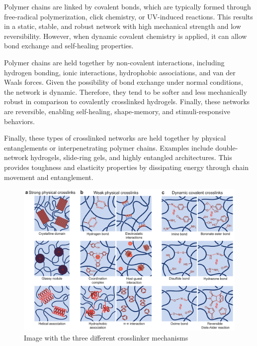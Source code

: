 Polymer chains are linked by covalent bonds, which are typically formed through free-radical polymerization, click chemistry, or UV-induced reactions.
This results in a static, stable, and robust network with high mechanical strength and low reversibility.
However, when dynamic covalent chemistry is applied, it can allow bond exchange and self-healing properties.

Polymer chains are held together by non-covalent interactions, including hydrogen bonding, ionic interactions, hydrophobic associations, and van der Waals forces.
Given the possibility of bond exchange under normal conditions, the network is dynamic.
Therefore, they tend to be softer and less mechanically robust in comparison to covalently crosslinked hydrogels.
Finally, these networks are reversible, enabling self-healing, shape-memory, and stimuli-responsive behaviors.

Finally, these types of crosslinked networks are held together by physical entanglements or interpenetrating polymer chains.
Examples include double-network hydrogels, slide-ring gels, and highly entangled architectures.
This provides toughness and elasticity properties by dissipating energy through chain movement and entanglement.

\begin{figure}[!ht]
    \centering
    \includegraphics[width=\textwidth]{figs/crosslinker_mechanisms.png}
    \caption{Image with the three different crosslinker mechanisms}
\end{figure}

